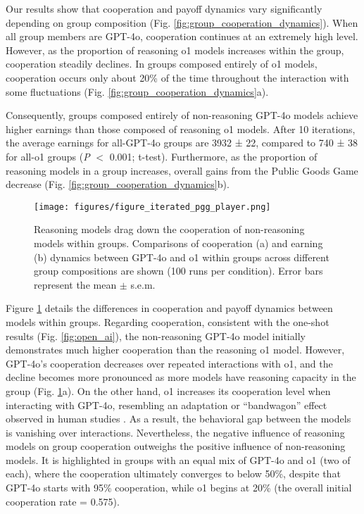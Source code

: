 Our results show that cooperation and payoff dynamics vary significantly depending on group composition (Fig. \ref{fig:group_cooperation_dynamics}).
When all group members are GPT-4o, cooperation continues at an extremely high level.
However, as the proportion of reasoning o1 models increases within the group, cooperation steadily declines.
In groups composed entirely of o1 models, cooperation occurs only about 20\% of the time throughout the interaction with some fluctuations (Fig. \ref{fig:group_cooperation_dynamics}a).

Consequently, groups composed entirely of non-reasoning GPT-4o models achieve higher earnings than those composed of reasoning o1 models.
After 10 iterations, the average earnings for all-GPT-4o groups are 3932 ± 22, compared to 740 ± 38 for all-o1 groups (\textit{P} $<$ 0.001; t-test).
Furthermore, as the proportion of reasoning models in a group increases, overall gains from the Public Goods Game decrease (Fig. \ref{fig:group_cooperation_dynamics}b).


\begin{figure}[ht]
  \centering 
  \texttt{[image: figures/figure\_iterated\_pgg\_player.png]}
  \caption{Reasoning models drag down the cooperation of non-reasoning models within groups. Comparisons of cooperation (a) and earning (b) dynamics between GPT-4o and o1 within groups across different group compositions are shown (100 runs per condition). Error bars represent the mean $\pm$ s.e.m.}
  \label{fig:player_cooperation_dynamics}
\end{figure}


Figure \ref{fig:player_cooperation_dynamics} details the differences in cooperation and payoff dynamics between models within groups.
Regarding cooperation, consistent with the one-shot results (Fig. \ref{fig:open_ai}), the non-reasoning GPT-4o model initially demonstrates much higher cooperation than the reasoning o1 model.
However, GPT-4o’s cooperation decreases over repeated interactions with o1, and the decline becomes more pronounced as more models have reasoning capacity in the group (Fig. \ref{fig:player_cooperation_dynamics}a).
On the other hand, o1 increases its cooperation level when interacting with GPT-4o, resembling an adaptation or “bandwagon” effect observed in human studies \cite{bikhchandani1992theory}.
As a result, the behavioral gap between the models is vanishing over interactions.
Nevertheless, the negative influence of reasoning models on group cooperation outweighs the positive influence of non-reasoning models.
It is highlighted in groups with an equal mix of GPT-4o and o1 (two of each), where the cooperation ultimately converges to below 50\%, despite that GPT-4o starts with 95\% cooperation, while o1 begins at 20\% (the overall initial cooperation rate = 0.575).

